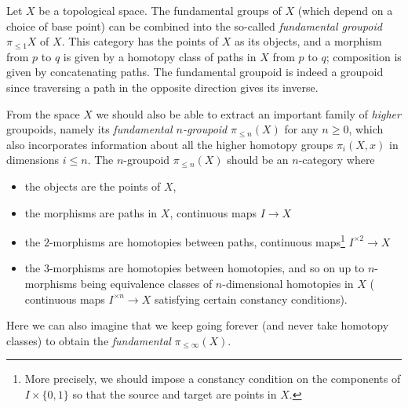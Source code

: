 \documentclass[a4paper,12pt]{article}
\begin{document}
\begin{defn}\label{ex:fundgpd}
  Let $X$ be a topological space. The fundamental groups of $X$ (which
  depend on a choice of base point) can be combined into the so-called
  \emph{fundamental groupoid} $\pi_{\leq 1}X$ of $X$. This category
  has the points of $X$ as its objects, and a morphism from $p$ to $q$
  is given by a homotopy class of paths in $X$ from $p$ to $q$;
  composition is given by concatenating paths. The fundamental
  groupoid is indeed a groupoid since traversing a path in the
  opposite direction gives its inverse.
\end{defn}

From the space $X$ we should also be able to extract an important
family of \emph{higher} groupoids, namely its \emph{fundamental $n$-groupoid}
$\pi_{\leq n}(X)$ for any $n \geq 0$, which also incorporates
information about all the higher
homotopy groups $\pi_{i}(X,x)$ in dimensions $i \leq n$. The
$n$-groupoid $\pi_{\leq n}(X)$ should be an $n$-category where
\begin{itemize}
\item the objects are the points of $X$, 
\item the morphisms are paths in $X$, \ie{} continuous maps $I \to X$
\item the $2$-morphisms are
homotopies between paths, \ie{} continuous maps\footnote{More
  precisely, we should impose a constancy condition on the components
  of $I \times \{0,1\}$ so that the source and target are points in $X$.} $I^{\times 2} \to X$
\item the $3$-morphisms are homotopies between
homotopies, and so on up to $n$-morphisms being equivalence classes of
$n$-dimensional homotopies in $X$ (\ie{} continuous maps
$I^{\times n} \to X$ satisfying certain constancy conditions).
\end{itemize}
Here we can also imagine that we keep going forever (and never take
homotopy classes) to obtain the \emph{fundamental \igpd{}}
$\pi_{\leq \infty}(X)$.
\end{document}
